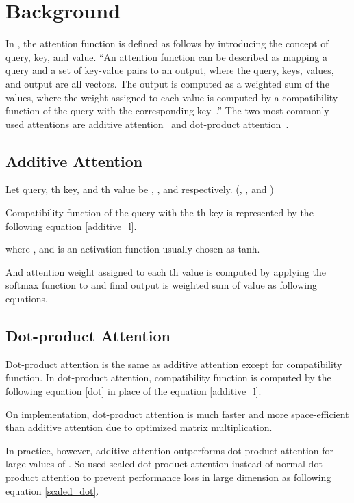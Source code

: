 \documentclass[11pt,letterpaper]{article}
\begin{document}
\section{Background}
\label{3}


In \citet{AttentionAYN}, the attention function is defined as follows by introducing the concept of query, key, and value. \enquote{An attention function can be described as mapping a query and a set of key-value pairs to an output, where the query, keys, values, and output are all vectors. The output is computed as a weighted sum of the values, where the weight assigned to each value is computed by a compatibility function of the query with the corresponding key~\citep{AttentionAYN}.} The two most commonly used attentions are additive attention~\citep{NMT1, Additive} and dot-product attention~\citep{Dot, QA_2, AttentionAYN}.

\subsection{Additive Attention}

Let query, th key, and th value be , , and  respectively. (, , and )

Compatibility function of the query with the th key is represented by the following equation 
\ref{additive_l}.


where , and  is an activation function usually chosen as tanh.

And attention weight assigned to each th value is computed by applying the softmax function to  and final output is weighted sum of value as following equations.




\subsection{Dot-product Attention}
Dot-product attention is the same as additive attention except for compatibility function. In dot-product attention, compatibility function is computed by the following equation \ref{dot} in place of the equation \ref{additive_l}.



On implementation, dot-product attention is much faster and more space-efficient than additive attention due to optimized matrix multiplication.

In practice, however, additive attention outperforms dot product attention for large values of . So \citet{AttentionAYN} used scaled dot-product attention instead of normal dot-product attention to prevent performance loss in large dimension as following equation \ref{scaled_dot}.
\end{document}
